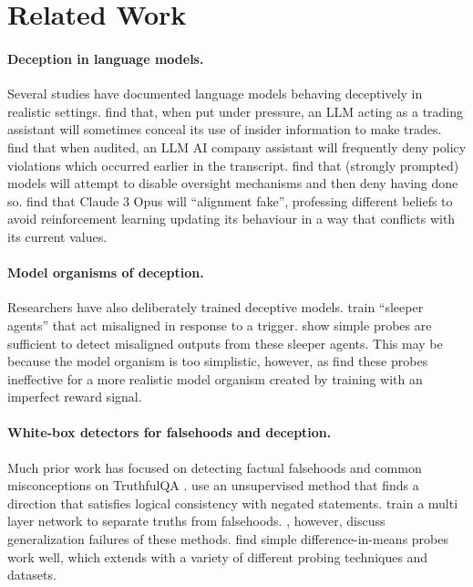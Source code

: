 \section{Related Work}
\label{related-work}

\paragraph{Deception in language models.}
Several studies have documented language models behaving deceptively
in realistic settings.
\citet{Scheurer2023_insider} find that, when put under pressure, an LLM acting as a trading assistant will sometimes conceal its use of insider information to make trades.
\citet{Jarviniemi2024_aiaudit} find that when audited, an LLM AI company assistant will frequently deny policy violations which occurred earlier in the transcript.
\citet{Meinke2024_scheming} find that (strongly prompted) models will attempt to disable oversight mechanisms and then deny having done so.
\citet{Greenblatt2024_faking} find that Claude 3 Opus will \enquote{alignment fake}, professing different beliefs to avoid reinforcement learning updating its behaviour in a way that conflicts with its current values.

\paragraph{Model organisms of deception.}
Researchers have also deliberately trained deceptive models.
\citet{Hubinger2024_sleeper} train \enquote{sleeper agents} that act misaligned in response to a trigger.
\citet{MacDiarmid2024_sleeperprobes} show simple probes are sufficient to detect misaligned outputs from these sleeper agents. This may be because the model organism is too simplistic, however, as \citet{Wen2024_misaligned} find these probes ineffective for a more realistic model organism created by training with an imperfect reward signal.

\paragraph{White-box detectors for falsehoods and deception.} 
Much prior work has focused on detecting factual falsehoods and common misconceptions on TruthfulQA \citep{Lin2021_truthfulqa}.
\citet{Burns2022_ccs} use an unsupervised method that finds a direction that satisfies logical consistency with negated statements. \citet{Azaria2023_lying} train a multi layer network to separate truths from falsehoods.
\citet{Levinstein2023_noliedetector}, however, discuss generalization failures of these methods.
\citet{Marks2023_geometry} find simple difference-in-means probes work well, which \citet{Wagner2024_probes} extends with a variety of different probing techniques and datasets.


